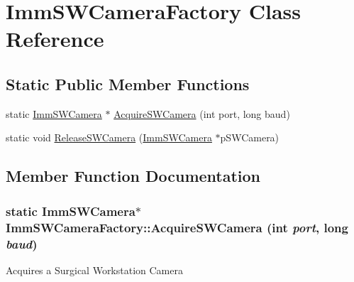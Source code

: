\hypertarget{classImmSWCameraFactory}{
\section{ImmSWCameraFactory Class Reference}
\label{classImmSWCameraFactory}
}
\subsection*{Static Public Member Functions}
\begin{DoxyCompactItemize}
\item 
static \hyperlink{classImmSWCamera}{ImmSWCamera} $\ast$ \hyperlink{classImmSWCameraFactory_a133b1ee14c66d668a17cacb21a974d62}{AcquireSWCamera} (int port, long baud)
\item 
static void \hyperlink{classImmSWCameraFactory_ae79071dfb76070b97d7c2c38263480ae}{ReleaseSWCamera} (\hyperlink{classImmSWCamera}{ImmSWCamera} $\ast$pSWCamera)
\end{DoxyCompactItemize}


\subsection{Member Function Documentation}
\hypertarget{classImmSWCameraFactory_a133b1ee14c66d668a17cacb21a974d62}{
\subsubsection[{AcquireSWCamera}]{\setlength{\rightskip}{0pt plus 5cm}static {\bf ImmSWCamera}$\ast$ ImmSWCameraFactory::AcquireSWCamera (int {\em port}, \/  long {\em baud})}}
\label{classImmSWCameraFactory_a133b1ee14c66d668a17cacb21a974d62}
Acquires a Surgical Workstation Camera


